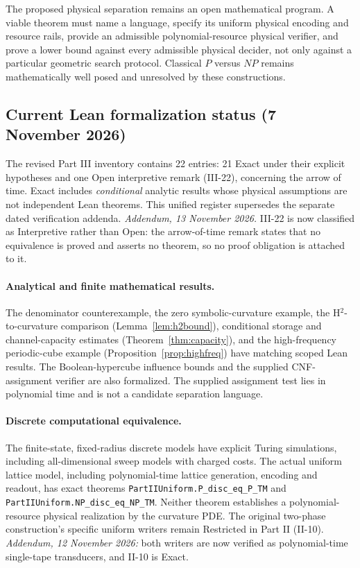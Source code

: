 \documentclass[11pt,a4paper]{article}
\begin{document}
The proposed physical separation remains an open mathematical program.
A viable theorem must name a language, specify its uniform physical
encoding and resource rails, provide an admissible polynomial-resource
physical verifier, and prove a lower bound against every admissible
physical decider, not only against a particular geometric search protocol.
Classical $P$ versus $NP$ remains mathematically well posed and unresolved
by these constructions.

\subsection{Current Lean formalization status (7 November 2026)}
\label{sec:current-lean-status}
The revised Part III inventory contains 22 entries:
21 Exact under their explicit hypotheses and one
Open interpretive remark (III-22), concerning the
arrow of time.  Exact includes \emph{conditional}
analytic results whose physical assumptions
are not independent Lean theorems.
This unified register supersedes
the separate dated verification addenda.
\emph{Addendum, 13 November 2026.}  III-22 is now classified as
Interpretive rather than Open: the arrow-of-time remark states that no
equivalence is proved and asserts no theorem, so no proof obligation is
attached to it.

\paragraph{Analytical and finite mathematical results.}
The denominator counterexample, the zero
symbolic-curvature example, the
H$^2$-to-curvature comparison
(Lemma~\ref{lem:h2bound}), conditional
storage and channel-capacity estimates
(Theorem~\ref{thm:capacity}), and the
high-frequency periodic-cube example
(Proposition~\ref{prop:highfreq}) have
matching scoped Lean results.
The Boolean-hypercube influence bounds
and the supplied CNF-assignment
verifier are also formalized.  The
supplied assignment test lies in
polynomial time and is not a
candidate separation language.

\paragraph{Discrete computational equivalence.}
The finite-state, fixed-radius discrete
models have explicit Turing simulations,
including all-dimensional sweep models
with charged costs.
The actual uniform lattice model,
including polynomial-time lattice
generation, encoding and readout,
has exact theorems
\texttt{PartIIUniform.P\_disc\_eq\_P\_TM}
and \texttt{PartIIUniform.NP\_disc\_eq\_NP\_TM}.
Neither theorem establishes
a polynomial-resource physical
realization by the curvature PDE.
The original two-phase construction's
specific uniform writers remain
Restricted in Part II (II-10).
\emph{Addendum, 12 November 2026:} both
writers are now verified as polynomial-time
single-tape transducers, and II-10 is Exact.
\end{document}
